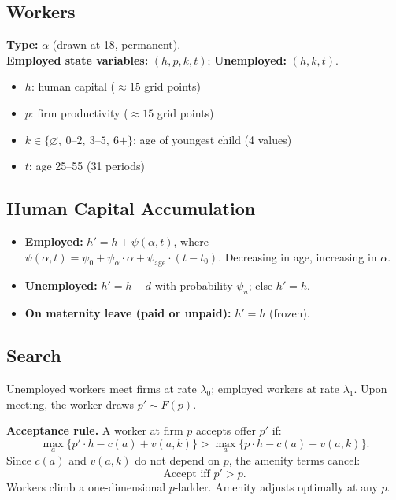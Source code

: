 \documentclass[11pt]{article}
\begin{document}
\subsection{Workers}

\textbf{Type:} $\alpha$ (drawn at 18, permanent). \\[4pt]
\textbf{Employed state variables:} $(h, p, k, t)$; \textbf{Unemployed:} $(h, k, t)$.
\begin{itemize}[nosep]
  \item $h$: human capital ($\approx 15$ grid points)
  \item $p$: firm productivity ($\approx 15$ grid points)
  \item $k \in \{\varnothing,\ 0\text{--}2,\ 3\text{--}5,\ 6+\}$: age of youngest child (4 values)
  \item $t$: age 25--55 (31 periods)
\end{itemize}

\subsection{Human Capital Accumulation}

\begin{itemize}[nosep]
  \item \textbf{Employed:} $h' = h + \psi(\alpha, t)$, where $\psi(\alpha, t) = \psi_0 + \psi_\alpha \cdot \alpha + \psi_{\text{age}} \cdot (t - t_0)$. Decreasing in age, increasing in $\alpha$.
  \item \textbf{Unemployed:} $h' = h - d$ with probability $\psi_u$; else $h' = h$.
  \item \textbf{On maternity leave (paid or unpaid):} $h' = h$ (frozen).
\end{itemize}

\subsection{Search}

Unemployed workers meet firms at rate $\lambda_0$; employed workers at rate $\lambda_1$. Upon meeting, the worker draws $p' \sim F(p)$.

\medskip\noindent\textbf{Acceptance rule.} A worker at firm $p$ accepts offer $p'$ if:
\[
  \max_{a} \big\{ p' \cdot h - c(a) + v(a,k) \big\} > \max_{a} \big\{ p \cdot h - c(a) + v(a,k) \big\}.
\]
Since $c(a)$ and $v(a,k)$ do not depend on $p$, the amenity terms cancel:
\begin{equation}\label{eq:acceptance}
  \text{Accept iff } p' > p.
\end{equation}
Workers climb a one-dimensional $p$-ladder. Amenity adjusts optimally at any $p$.
\end{document}
